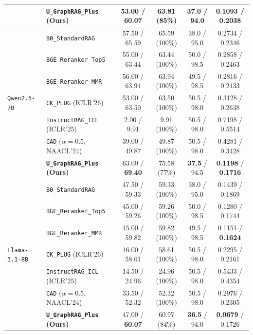 \documentclass[11pt]{article}
\begin{document}
\begin{table}[t]
{{\begin{tabular}{llcccc}
& \textbf{\texttt{U\_GraphRAG\_Plus} (Ours)} & 53.00 / 60.07 & 63.81 (85\%) & \textbf{37.0} / 94.0 & \textbf{0.1093} / \textbf{0.2038} \\
\midrule
\multirow{7}{*}{\texttt{Qwen2.5-7B}}
& \texttt{B0\_StandardRAG} & 57.50 / 65.59 & 65.59 (100\%) & 38.0 / 95.0 & 0.2734 / 0.2346 \\
& \texttt{BGE\_Reranker\_Top5} & 55.00 / 63.44 & 63.44 (100\%) & 50.0 / 98.5 & 0.2858 / 0.2463 \\
& \texttt{BGE\_Reranker\_MMR} & 56.00 / 63.94 & 63.94 (100\%) & 49.5 / 98.5 & 0.2816 / 0.2433 \\
& \texttt{CK\_PLUG} (ICLR'26) & 53.00 / 63.50 & 63.50 (100\%) & 50.5 / 98.0 & 0.3128 / 0.2638 \\
& \texttt{InstructRAG\_ICL} (ICLR'25) & 2.00 / 9.91 & 9.91 (100\%) & 50.5 / 98.0 & 0.7198 / 0.5514 \\
& \texttt{CAD} ($\alpha=0.5$, NAACL'24) & 39.00 / 49.87 & 49.87 (100\%) & 50.5 / 98.0 & 0.4281 / 0.3428 \\
& \textbf{\texttt{U\_GraphRAG\_Plus} (Ours)} & 63.00 / \textbf{69.40} & 75.58 (77\%) & \textbf{37.5} / 94.5 & \textbf{0.1198} / \textbf{0.1716} \\
\midrule
\multirow{7}{*}{\texttt{Llama-3.1-8B}}
& \texttt{B0\_StandardRAG} & 47.50 / 59.33 & 59.33 (100\%) & 38.0 / 95.0 & 0.1439 / 0.1869 \\
& \texttt{BGE\_Reranker\_Top5} & 45.00 / 59.26 & 59.26 (100\%) & 50.0 / 98.5 & 0.1280 / 0.1744 \\
& \texttt{BGE\_Reranker\_MMR} & 45.00 / 59.82 & 59.82 (100\%) & 49.5 / 98.5 & 0.1151 / \textbf{0.1624} \\
& \texttt{CK\_PLUG} (ICLR'26) & 46.00 / 58.61 & 58.61 (100\%) & 50.5 / 98.0 & 0.2295 / 0.2161 \\
& \texttt{InstructRAG\_ICL} (ICLR'25) & 14.50 / 24.96 & 24.96 (100\%) & 50.5 / 98.0 & 0.5433 / 0.4354 \\
& \texttt{CAD} ($\alpha=0.5$, NAACL'24) & 33.50 / 52.32 & 52.32 (100\%) & 50.5 / 98.0 & 0.2976 / 0.2305 \\
& \textbf{\texttt{U\_GraphRAG\_Plus} (Ours)} & 47.00 / \textbf{60.07} & 60.97 (84\%) & \textbf{36.5} / 94.0 & \textbf{0.0679} / 0.1726 \\
\bottomrule
\end{tabular}
}}
\end{table}
\end{document}
